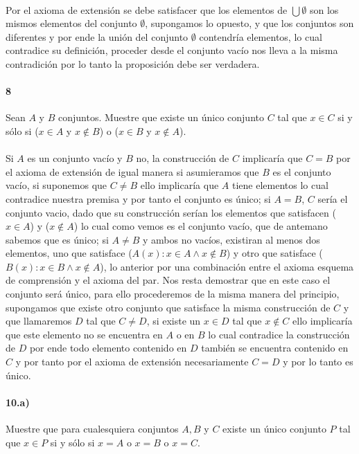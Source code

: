 \documentclass{article}
\begin{document}
	\paragraph{} Por el axioma de extensión se debe satisfacer que los elementos de $\bigcup \emptyset$ son los mismos elementos del conjunto $\emptyset$, supongamos lo opuesto, y que los conjuntos son diferentes y por ende la unión del conjunto $\emptyset$ contendría elementos, lo cual contradice su definición, proceder desde el conjunto vacío nos lleva a la misma contradición por lo tanto la proposición debe ser verdadera.
	\paragraph{8} Sean $A$ y $B$ conjuntos. Muestre que existe un único conjunto $C$ tal que $x \in C$ si y sólo si ($x \in A$ y $x \notin B $) o ($x \in B$ y $x \notin A $).
	\paragraph{} Si $A$ es un conjunto vacío y $B$ no, la construcción de $C$ implicaría que $C=B$ por el axioma de extensión de igual manera si asumieramos que $B$ es el conjunto vacío, si suponemos que $C \neq B$ ello implicaría que $A$ tiene elementos lo cual contradice nuestra premisa y por tanto el conjunto es único; si $A=B$, $C$ sería el conjunto vacio, dado que su construcción serían los elementos que satisfacen ($x \in A$) y ($x \notin A$) lo cual como vemos es el conjunto vacío, que de antemano sabemos que es único; si $A \neq B$ y ambos no vacíos, existiran al menos dos elementos, uno que satisface ($A(x): x \in A \land x \notin B$) y otro que satisface ($B(x): x \in B \land x \notin A$), lo anterior por una combinación entre el axioma esquema de comprensión y el axioma del par. Nos resta demostrar que en este caso el conjunto será único, para ello procederemos de la misma manera del principio, supongamos que existe otro conjunto que satisface la misma construcción de $C$ y que llamaremos $D$ tal que $C \neq D$, si existe un $x \in D$ tal que $x \notin C$ ello implicaría que este elemento no se encuentra en $A$ o en $B$ lo cual contradice la construcción de $D$ por ende todo elemento contenido en $D$ también se encuentra contenido en $C$ y por tanto por el axioma de extensión necesariamente $C=D$ y por lo tanto es único.
	\paragraph{10.a)} Muestre que para cualesquiera conjuntos $A, B$ y $C$ existe un único conjunto $P$ tal que $x \in P$ si y sólo si  $x = A$ o $x = B$ o $x = C$.
\end{document}
